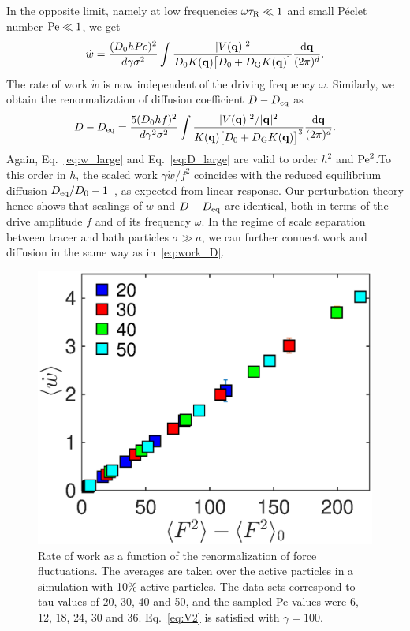 \documentclass[pre, superscriptaddress, twocolumn,pre]{revtex4-1}
\newcommand{\dd}{\text{d}}
\begin{document}
In the opposite limit, namely at low frequencies $\omega\tau_{\rm R}\ll 1$ and small P\'eclet number ${\rm Pe}\ll1$, we get
\begin{equation}\label{eq:w_large}
	\dot w = \frac{(D_0 hPe)^2}{d\gamma\sigma^2} \int \frac{|V({\bf q})|^2}{D_0K({\bf q}) \big[D_0 + D_{\rm G}K({\bf q})\big]} \frac{\dd{\bf q}}{(2\pi)^d} .
\end{equation}
The rate of work $\dot w$ is now independent of the driving frequency $\omega$.  Similarly, we obtain the renormalization of diffusion coefficient $D-D_{\rm eq}$ as
\begin{equation}\label{eq:D_large}
	D - D_{\rm eq} = \frac{5(D_0 hf)^2}{d\gamma^2\sigma^2} \int \frac{|V({\bf q})|^2/|{\bf q}|^2}{K({\bf q})\big[D_0 + D_{\rm G}K({\bf q})\big]^3} \frac{\dd{\bf q}}{(2\pi)^d} .
\end{equation}
Again, Eq.~\ref{eq:w_large} and Eq.~\ref{eq:D_large} are valid to order $h^2$ and ${\rm Pe}^2$.To this order in $h$, the scaled work $\gamma\dot w/f^2$ coincides with the reduced equilibrium diffusion $D_{\rm eq}/D_0-1$~\cite{Demery2011, Demery2014}, as expected from linear response.
Our perturbation theory hence shows that scalings of $\dot w$ and $D-D_{\rm eq}$ are identical, both in terms of the drive amplitude $f$ and of its frequency $\omega$. In the regime of scale separation between tracer and bath particles $\sigma\gg a$, we can further connect work and diffusion in the same way as in~\eqref{eq:work_D}.
\begin{figure}[tbp]
\centering
\includegraphics[width=0.85\linewidth]{dw_fvar_10p_active_av_active.eps}
\caption{Rate of work as a function of the renormalization of force fluctuations. The averages are taken over the active particles in a simulation with 10\% active particles. The data sets correspond to tau values of 20, 30, 40 and 50, and the sampled Pe values were 6, 12, 18, 24, 30 and 36. Eq.~\ref{eq:V2} is satisfied with $\gamma=100$.}
\label{fig:dw_fvar}
\end{figure}
\end{document}
